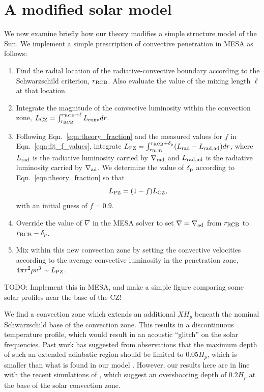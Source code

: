\documentclass{aastex631}
\newcommand{\gradrad}{\ensuremath{\nabla_{\rm{rad}}}}
\newcommand{\gradad}{\ensuremath{\nabla_{\rm{ad}}}}
\newcommand{\justgrad}{\ensuremath{\nabla}}
\newcommand{\delp}{\ensuremath{\delta_{\rm{p}}}}
\begin{document}
\section{A modified solar model}
\label{sec:solar_model}
We now examine briefly how our theory modifies a simple structure model of the Sun.
We implement a simple prescription of convective penetration in MESA \citep{paxton_etal_2013} as follows:
\begin{enumerate}
\item Find the radial location of the radiative-convective boundary according to the Schwarzschild criterion, $r_{\rm{RCB}}$.
Also evaluate the value of the mixing length $\ell$ at that location.
\item Integrate the magnitude of the convective luminosity within the convection zone, $L_{\rm{CZ}} = \int_{r_{\rm{RCB}}}^{r_{\rm{RCB}} + \ell} L_{\rm{conv}} dr$.
\item Following Eqn.~\ref{eqn:theory_fraction} and the measured values for $f$ in Eqn.~\ref{eqn:fit_f_values}, integrate $L_{\rm{PZ}} = \int_{r_{\rm{RCB}}}^{r_{\rm{RCB}} + \delp} (L_{\rm{rad}} - L_{\rm{rad,ad}}) dr$, where $L_{\rm{rad}}$ is the radiative luminosity carried by $\gradrad$ and $L_{\rm{rad,ad}}$ is the radiative luminosity carried by $\gradad$.
We determine the value of $\delp$ according to Eqn.~\ref{eqn:theory_fraction} so that
\begin{equation}
L_{\rm{PZ}} = (1 - f)L_{\rm{CZ}},
\label{eqn:mesa_equation}
\end{equation}
with an initial guess of $f = 0.9$.
\item Override the value of $\justgrad$ in the MESA solver to set $\justgrad = \gradad$ from $r_{\rm{RCB}}$ to $r_{\rm{RCB}} - \delta_p$.
\item Mix within this new convection zone by setting the convective velocities according to the average convective luminosity in the penetration zone, $4\pi r^2 \rho v^3 \sim L_{\rm{PZ}}$.
\end{enumerate}

TODO: Implement this in MESA, and make a simple figure comparing some solar profiles near the base of the CZ!

We find a convection zone which extends an additional $X H_p$ beneath the nominal Schwarzschild base of the convection zone.
This results in a discontinuous temperature profile, which would result in an acoustic ``glitch'' on the solar frequencies.
Past work has suggested from observations that the maximum depth of such an extended adiabatic region should be limited to $0.05 H_p$, which is smaller than what is found in our model \citep[see e.g., section 7.2.1 of][]{basu2016}.
However, our results here are in line with the recent simulations of \citet{kapyla2019}, which suggest an overshooting depth of $0.2 H_p$ at the base of the solar convection zone.
\end{document}
